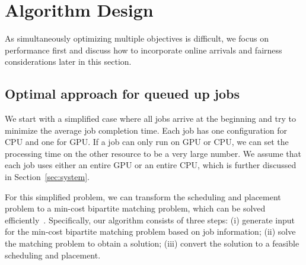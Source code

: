 \section{Algorithm Design}
\label{sec:alg}

As simultaneously optimizing multiple objectives is difficult, we focus on performance first and discuss how to incorporate online arrivals and fairness considerations later in this section.






\subsection{Optimal approach for queued up jobs}

We start with a simplified case where all jobs arrive at the beginning and try to minimize the average job completion time. 
Each job has one configuration for CPU and one for GPU. If a job can only run on GPU or CPU, we can set the processing time on the other resource to be a very large number. 
We assume that each job uses either an entire GPU or an entire CPU, which is further discussed in Section~\ref{sec:system}.

For this simplified problem, we can transform the scheduling and placement problem to a min-cost bipartite matching problem, which can be solved efficiently~\cite{galil1988n}.
Specifically, our algorithm consists of three steps: (i) generate input for the min-cost bipartite matching problem based on job information; (ii) solve the matching problem to obtain a solution; (iii) convert the solution to a feasible scheduling and placement. 


